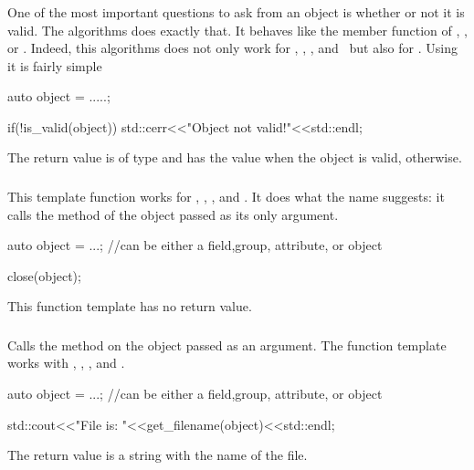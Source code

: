 \subsubsection{}

One of the most important questions to ask from an object is whether or not it
is valid. The  algorithms does exactly that. It behaves like 
the  member function of \nxgroup, \nxfield, or \nxattribute. 
Indeed, this algorithms does not only work for \nxobject, \nxgroup, \nxfield,
and \nxattribute\ but also for \nxfile. Using it is fairly simple 
\begin{cppcode}
auto object = .....; 

if(!is_valid(object))
    std::cerr<<"Object not valid!"<<std::endl;
\end{cppcode}
The return value is of type  and has the value  when the
object is valid,  otherwise.

\subsubsection{}

This template function works for \nxgroup, \nxfield, \nxattribute, and
\nxobject. It does what the name suggests: it calls the  method of
the object passed as its only argument. 
\begin{cppcode}
auto object = ...; //can be either a field,group, attribute, or object

close(object);
\end{cppcode}
This function template has no return value.

\subsubsection{}

Calls the  method on the object passed as an argument. The
function template works with \nxobject, \nxfield, \nxgroup, and \nxattribute. 
\begin{cppcode}
auto object = ...; //can be either a field,group, attribute, or object

std::cout<<"File is: "<<get_filename(object)<<std::endl;
\end{cppcode}
The return value is a string with the name of the file.

\subsubsection{}

